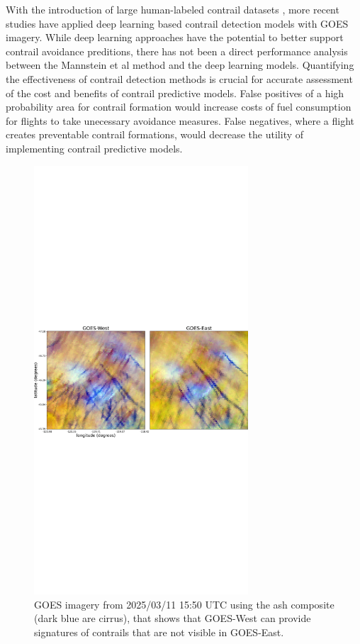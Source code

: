 With the introduction of large human-labeled contrail datasets \cite{opencontrails, landsat}, more recent studies have applied deep learning based contrail detection models \cite{opencontrails, covid} with GOES imagery. While deep learning approaches have the potential to better support contrail avoidance preditions, there has not been a direct performance analysis between the Mannstein et al method and the deep learning models. Quantifying the effectiveness of contrail detection methods is crucial for accurate assessment of the cost and benefits of contrail predictive models. False positives of a high probability area for contrail formation would increase costs of fuel consumption for flights to take unecessary avoidance measures. False negatives, where a flight creates preventable contrail formations, would decrease the utility of implementing contrail predictive models. 

\begin{figure}
    \centering
    \includegraphics[width=8cm]{figures/west_best.png}
    \caption{GOES imagery from 2025/03/11 15:50 UTC using the ash composite (dark blue are cirrus), that shows that GOES-West can provide signatures of contrails that are not visible in GOES-East.}
    \label{west_best}
\end{figure}


